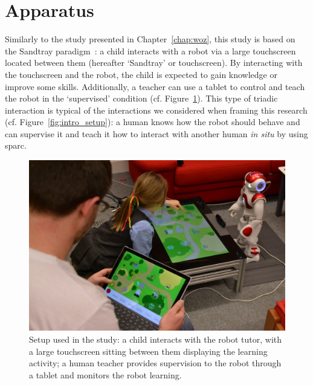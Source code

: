 \section{Apparatus}

Similarly to the study presented in Chapter~\ref{chap:woz}, this study is based on the Sandtray paradigm~\citep{baxter2012touchscreen}: a child interacts with a robot via a large touchscreen located between them (hereafter `Sandtray' or touchscreen). By interacting with the touchscreen and the robot, the child is expected to gain knowledge or improve some skills. Additionally, a teacher can use a tablet to control and teach the robot in the `supervised' condition (cf. Figure~\ref{fig:tutoring_setup}). This type of triadic interaction is typical of the interactions we considered when framing this research (cf. Figure~\ref{fig:intro_setup}): a human knows how the robot should behave and can supervise it and teach it how to interact with another human \textit{in situ} by using \gls{sparc}.


\begin{figure}[ht]
	\centering
	\includegraphics[width=1\textwidth]{setup.jpg}
	\caption{Setup used in the study: a child interacts with the robot tutor, with a large touchscreen sitting between them displaying the learning activity; a human teacher provides supervision to the robot through a tablet and monitors the robot learning.}
	\label{fig:tutoring_setup}
\end{figure}

